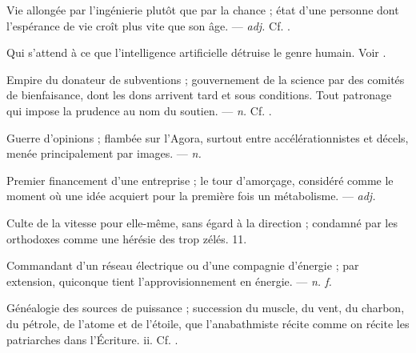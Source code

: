  Vie allongée par l'ingénierie plutôt que par la chance ; état d'une personne dont l'espérance de vie croît plus vite que son âge.  ---  \textit{adj.} Cf. .

  Qui s'attend à ce que l'intelligence artificielle détruise le genre humain. Voir .

  Empire du donateur de subventions ; gouvernement de la science par des comités de bienfaisance, dont les dons arrivent tard et sous conditions.   Tout patronage qui impose la prudence au nom du soutien. ---  \textit{n.} Cf. .

 Guerre d'opinions ; flambée sur l'Agora, surtout entre accélérationnistes et décels, menée principalement par images. ---  \textit{n.}

 Premier financement d'une entreprise ; le tour d'amorçage, considéré comme le moment où une idée acquiert pour la première fois un métabolisme.   ---  \textit{adj.}

 Culte de la vitesse pour elle-même, sans égard à la direction ; condamné par les orthodoxes comme une hérésie des trop zélés.   11.

 Commandant d'un réseau électrique ou d'une compagnie d'énergie ; par extension, quiconque tient l'approvisionnement en énergie. ---  \textit{n. f.}

 Généalogie des sources de puissance ; succession du muscle, du vent, du charbon, du pétrole, de l'atome et de l'étoile, que l'anabathmiste récite comme on récite les patriarches dans l'Écriture.  ii. Cf. .
